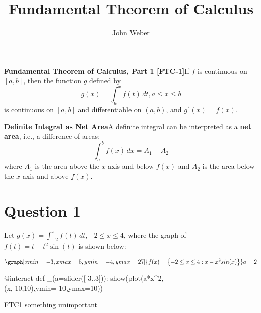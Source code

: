 \documentclass{ximera}
\title{Fundamental Theorem of Calculus}
\author{John Weber}
\begin{document}
\maketitle

\begin{thm}
\textbf{Fundamental Theorem of Calculus, Part 1 [FTC-1]}\newline\newline If $f$ is continuous on $\left [a,b\right ]$, then the function $g$ defined by $$g(x)=\int_a^x{f(t)\,dt}, a\leq x\leq b$$ is continuous on $\left [a,b\right ]$ and differentiable on $\left (a,b\right )$, and $g^{\,\prime}(x)=f(x)$.
\end{thm}

\begin{defn}
\textbf{Definite Integral as Net Area}\newline\newline A definite integral can be interpreted as a \textbf{net area}, i.e., a difference of areas: $$\int_a^b{f(x)\,dx}=A_1-A_2$$
where $A_1$ is the area above the $x$-axis and below $f(x)$ and $A_2$ is the area below the $x$-axis and above $f(x)$.
\end{defn}

\section*{Question 1}

Let $\displaystyle g(x)=\int_{-2}^x{f(t)\,dt}, -2\leq x\leq 4$, where the graph of $f(t)=t-t^2\sin{(t)}$ is shown below:

\[
\graph[xmin=-3, xmax=5, ymin=-4, ymax=27]{f(x)=\left\{-2\leq x\leq 4 : x - x^2 sin(x)\right\}}
a=2
\]

\begin{sageCell}
@interact
def _(a=slider([-3..3])):
	show(plot(a*x^2,(x,-10,10),ymin=-10,ymax=10))
\end{sageCell}

\begin{example}
\begin{foldable}
  FTC1  something
unimportant 
\end{foldable}
\end{example}
\end{document}
